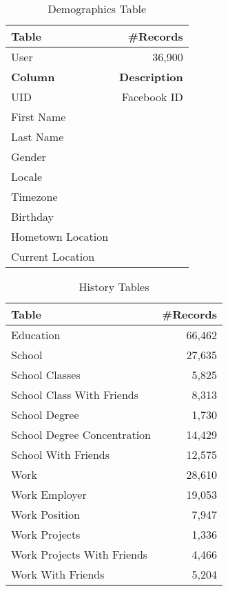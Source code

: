 \documentclass[letterpaper]{article}
\begin{document}
\begin{table}
\centering
\caption{\small Demographics Table}
\label{tab:demographics}
\begin{tabular}{|>{\small}l|>{\small}r|}
\hline
\textbf{Table} & \textbf{\#Records} \\
\hline
User & 36,900 \\
\hline
\hline
\textbf{Column} & \textbf{Description} \\
\hline
UID & Facebook ID \\
\hline
First Name &  \\
\hline
Last Name &  \\
\hline
Gender &  \\
\hline
Locale &  \\
\hline
Timezone &  \\
\hline
Birthday &  \\
\hline
Hometown Location &  \\
\hline
Current Location &  \\
\hline
\end{tabular}
\end{table}




\begin{table}
\centering
\caption{\small History Tables}
\label{tab:history}
\begin{tabular}{|>{\small}l|>{\small}r|}
\hline
\textbf{Table} & \textbf{\#Records} \\
\hline
Education & 66,462 \\
\hline
School & 27,635 \\
\hline
School Classes & 5,825 \\
\hline
School Class With Friends & 8,313 \\
\hline
School Degree & 1,730 \\
\hline
School Degree Concentration & 14,429 \\
\hline
School With Friends & 12,575 \\
\hline
Work & 28,610 \\
\hline
Work Employer & 19,053 \\
\hline
Work Position & 7,947 \\
\hline
Work Projects & 1,336 \\
\hline
Work Projects With Friends & 4,466 \\
\hline
Work With Friends & 5,204 \\
\hline
\end{tabular}
\end{table}
\end{document}
